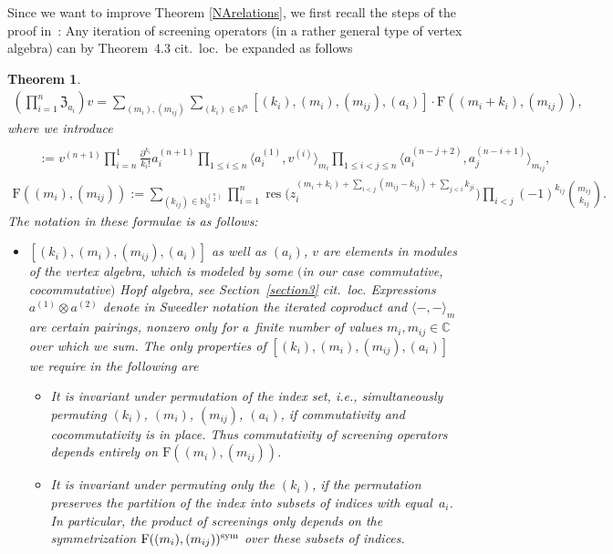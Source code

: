 \documentclass[10pt,a4paper]{amsart}
\numberwithin{equation}{section}
\newtheorem{teo}{Theorem}[section]
\newcommand{\N}{\mathbb{N}}
\newcommand{\C}{\mathbb{C}}
\newcommand{\zem}{\mathfrak{Z}}
\newcommand{\Fp}{\mathrm{F}}
\begin{document}
Since we want to improve Theorem \ref{NArelations}, we first recall the steps of the proof in~\cite{Len17}: Any iteration of screening operators (in a rather general type of vertex algebra) can by Theorem~4.3 cit.~loc.~be expanded as follows
\begin{teo}\label{associativity}
\begin{gather*}
\left(\prod_{i=1}^n \zem_{a_i}\right)  v
=\sum_{(m_i),(m_{ij})} \sum_{(k_i)\in \N^n} [(k_i),(m_i),(m_{ij}),(a_i)]\cdot \Fp((m_i+k_i),(m_{ij})),
\end{gather*}
where we introduce
\begin{gather*}
[(k_i),(m_i),(m_{ij}),(a_i)]\\
\qquad{} :=v^{(n+1)}\prod_{i=n}^1 \frac{\partial^{k_i}}{k_i!}a_i^{(n+1)}
  \prod_{1\leq i \leq n}\big\langle a_i^{(1)},v^{(i)}\big\rangle_{m_i}
\prod_{1\leq i<j \leq n} \big\langle a_i^{(n-j+2)},a_j^{(n-i+1)}\big\rangle_{m_{ij}},\\
\Fp((m_i),(m_{ij}))
:=\sum_{(k_{ij})\in \N_0^{n\choose 2}}\prod_{i=1}^n \operatorname{res}\big(z_i^{(m_i+k_i)+\sum_{i<j}(m_{ij}-k_{ij})+\sum_{j<i}k_{ji}}\big)\prod_{i<j} (- 1)^{k_{ij}}{m_{ij} \choose k_{ij}}.
\end{gather*}
The notation in these formulae is as follows:
\begin{itemize}\itemsep=0pt
	\item $[(k_i),(m_i),(m_{ij}),(a_i)]$ as well as $(a_i)$, $v$ are elements in modules of the vertex algebra, which is modeled by some $($in our case commutative, cocommutative$)$ Hopf algebra, see Section~\ref{section3} cit.~loc. Expressions $a^{(1)}\otimes a^{(2)}$ denote in Sweedler notation the iterated coproduct and $\langle-,-\rangle_m$ are certain pairings, nonzero only for a~finite number of values $m_i,m_{ij}\in \C$ over which we sum. The only properties of $[(k_i),(m_i),(m_{ij}),(a_i)]$ we require in the following are
	\begin{itemize}\itemsep=0pt
		\item It is invariant under permutation of the index set, i.e., simultaneously permuting $(k_i)$, $(m_i)$, $(m_{ij})$, $(a_i)$, if commutativity and cocommutativity is in place. Thus commutativity of screening operators depends entirely on $\Fp((m_i),(m_{ij}))$.
		\item It is invariant under permuting only the $(k_i)$, if the permutation preserves the partition of the index into subsets of indices with equal~$a_i$. In particular, the product of screenings only depends on the symmetrization $\Fp((m_i),(m_{ij}))^{{\rm sym}}$ over these subsets of indices.

\end{itemize}
\end{itemize}
\end{teo}
\end{document}
